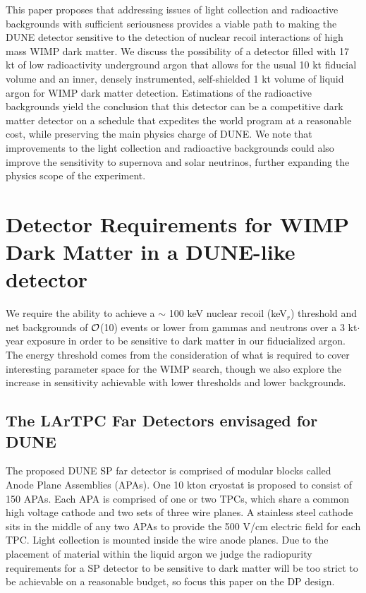 \documentclass[a4paper,11pt]{article}
\begin{document}
This paper proposes that addressing issues of light collection and radioactive backgrounds with sufficient seriousness provides a viable path to making the DUNE detector sensitive to the detection of nuclear recoil interactions of high mass WIMP dark matter. We discuss the possibility of a detector filled with 17 kt of low radioactivity underground argon that allows for the usual 10 kt fiducial volume and an inner, densely instrumented, self-shielded 1 kt volume of liquid argon for WIMP dark matter detection. Estimations of the radioactive backgrounds yield the conclusion that this detector can be a competitive dark matter detector on a schedule that expedites the world program at a reasonable cost, while preserving the main physics charge of DUNE.
We note that improvements to the light collection and radioactive backgrounds could also improve the sensitivity to supernova and solar neutrinos, further expanding the physics scope of the experiment.

\section{Detector Requirements for WIMP Dark Matter in a DUNE-like detector}
We require the ability to achieve a $\sim$ 100 keV nuclear recoil (keV$_r$) threshold and net backgrounds of $\cal{O}$(10) events or lower from gammas and neutrons over a 3 kt$\cdot$year exposure in order to be sensitive to dark matter in our fiducialized argon. The energy threshold comes from the consideration of what is required to cover interesting parameter space for the WIMP search, though we also explore the increase in sensitivity achievable with lower thresholds and lower backgrounds.

\subsection {The LArTPC Far Detectors envisaged for DUNE}

The proposed DUNE SP far detector is comprised of modular blocks called Anode Plane Assemblies (APAs). One 10 kton cryostat is proposed to consist of 150 APAs. Each APA is comprised of one or two TPCs, which share a common high voltage cathode and two sets of three wire planes. A stainless steel cathode sits in the middle of any two APAs to provide the 500 V/cm electric field for each TPC. Light collection is mounted inside the wire anode planes. Due to the placement of material within the liquid argon we judge the radiopurity requirements for a SP detector to be sensitive to dark matter will be too strict to be achievable on a reasonable budget, so focus this paper on the DP design. 
\end{document}
